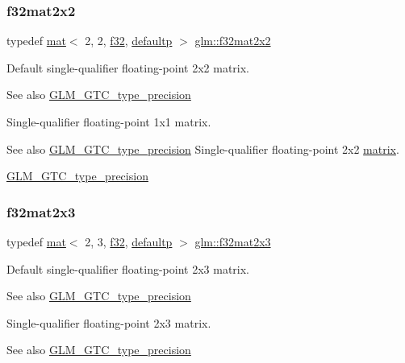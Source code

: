 \subsubsection{\texorpdfstring{f32mat2x2}{f32mat2x2}}
{\footnotesize\ttfamily typedef \hyperlink{structglm_1_1mat}{mat}$<$ 2, 2, \hyperlink{group__gtc__type__precision_ga0ec999b57f5330d9021256e96038df04}{f32}, \hyperlink{namespaceglm_a36ed105b07c7746804d7fdc7cc90ff25a9d21ccd8b5a009ec7eb7677befc3bf51}{defaultp} $>$ \hyperlink{group__gtc__type__precision_ga3c0ffd3a47ae47ff05d5ea6e90825caa}{glm\+::f32mat2x2}}

Default single-\/qualifier floating-\/point 2x2 matrix. \begin{DoxySeeAlso}{See also}
\hyperlink{group__gtc__type__precision}{G\+L\+M\+\_\+\+G\+T\+C\+\_\+type\+\_\+precision}
\end{DoxySeeAlso}
Single-\/qualifier floating-\/point 1x1 matrix. \begin{DoxySeeAlso}{See also}
\hyperlink{group__gtc__type__precision}{G\+L\+M\+\_\+\+G\+T\+C\+\_\+type\+\_\+precision} Single-\/qualifier floating-\/point 2x2 \hyperlink{_s_d_l__opengl__glext_8h_a7b24a3f2f56eb1244ae69dacb4fecb6f}{matrix}. 

\hyperlink{group__gtc__type__precision}{G\+L\+M\+\_\+\+G\+T\+C\+\_\+type\+\_\+precision} 
\end{DoxySeeAlso}
\mbox{\label{group__gtc__type__precision_ga1f5a1129669d427f5fbc5f02ff52c366}} 
\subsubsection{\texorpdfstring{f32mat2x3}{f32mat2x3}}
{\footnotesize\ttfamily typedef \hyperlink{structglm_1_1mat}{mat}$<$ 2, 3, \hyperlink{group__gtc__type__precision_ga0ec999b57f5330d9021256e96038df04}{f32}, \hyperlink{namespaceglm_a36ed105b07c7746804d7fdc7cc90ff25a9d21ccd8b5a009ec7eb7677befc3bf51}{defaultp} $>$ \hyperlink{group__gtc__type__precision_ga1f5a1129669d427f5fbc5f02ff52c366}{glm\+::f32mat2x3}}

Default single-\/qualifier floating-\/point 2x3 matrix. \begin{DoxySeeAlso}{See also}
\hyperlink{group__gtc__type__precision}{G\+L\+M\+\_\+\+G\+T\+C\+\_\+type\+\_\+precision}
\end{DoxySeeAlso}
Single-\/qualifier floating-\/point 2x3 matrix. \begin{DoxySeeAlso}{See also}
\hyperlink{group__gtc__type__precision}{G\+L\+M\+\_\+\+G\+T\+C\+\_\+type\+\_\+precision} 
\end{DoxySeeAlso}
\mbox{\label{group__gtc__type__precision_ga56deb277c1d5c1f42a80982372b4ed6c}} 

